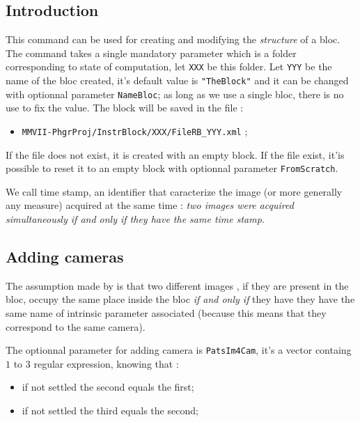 \subsection{Introduction}

This command can be used for creating and modifying the \emph{structure} of a bloc. The 
command takes a single mandatory parameter which is a folder corresponding to  state of computation,
let {\tt XXX} be this folder.
Let {\tt YYY} be the name of the bloc created, it's default value is
{\tt "TheBlock"} and it can be changed  with optionnal parameter {\tt NameBloc};
as long as we use a single bloc, there is no use to fix the value.
The block will be saved in the file :

\begin{itemize}
    \item  {\tt MMVII-PhgrProj/InstrBlock/XXX/FileRB\_YYY.xml}  ;
\end{itemize}

If the file does not exist, it is created with an empty block. 
If the file exist, it'is possible to reset it to an empty block
with optionnal parameter {\tt FromScratch}.

We call time stamp, an identifier that caracterize the  image (or more
generally any measure) acquired  at the same time : \emph{two images
were acquired simultaneously if and only if they have the same time stamp}.


\subsection{Adding cameras}

The assumption made by \PPP is that two different images , if they
are present in the bloc, occupy the same place inside the bloc \emph{if and only if}
they have they have the same name of intrinsic parameter associated
(because this means that they correspond to the same camera).

The optionnal parameter  for adding camera is {\tt PatsIm4Cam}, it's a
vector containg $1$ to $3$ regular expression, knowing that :

\begin{itemize}
    \item  if not settled the second  equals the first;
    \item  if not settled the third  equals the second;
\end{itemize}


